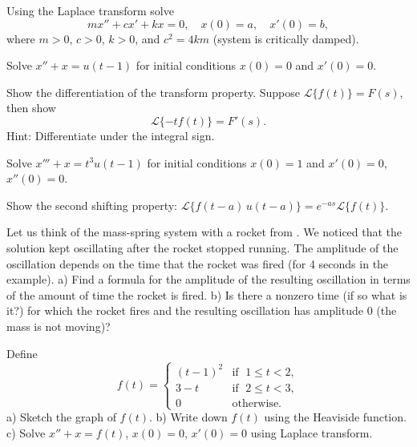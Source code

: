 \begin{exercise}
Using the Laplace transform solve
\begin{equation*}
m x'' + c x' + k x = 0 , \quad x(0) = a, \quad x'(0) = b ,
\end{equation*}
where $m > 0$, $c > 0$, $k > 0$, and
$c^2 = 4km$ (system is critically damped).
\end{exercise}

\begin{exercise}
Solve $x'' + x = u(t-1)$ for initial conditions $x(0) = 0$ and $x'(0) = 0$.
\end{exercise}

\begin{exercise}
Show the differentiation of the transform property.  Suppose
$\mathcal{L} \{ f(t) \} = F(s)$, then show
\begin{equation*}
\mathcal{L} \{ -t f(t) \} = F'(s) .
\end{equation*}
Hint: Differentiate under the integral sign.
\end{exercise}

\begin{exercise}
Solve $x''' + x = t^3 u(t-1)$ for initial conditions $x(0) = 1$ and $x'(0) =
0$, $x''(0) = 0$.
\end{exercise}

\begin{exercise}
Show the second shifting property: 
$\mathcal{L} \{ f(t-a) \, u(t-a) \} = e^{-as} \mathcal{L} \{ f(t) \}$.
\end{exercise}

\begin{exercise}
Let us think of the mass-spring system with a rocket from
.  We noticed that the solution kept oscillating
after the rocket stopped running.  The amplitude of the oscillation depends
on the time that the rocket was fired (for 4 seconds in the example).  a)
Find a formula for the amplitude of the resulting oscillation
in terms of the amount of time the rocket is fired.  b) Is there
a nonzero time (if so what is it?)
for which the rocket fires and the resulting oscillation
has amplitude 0 (the mass is not moving)?
\end{exercise}

\begin{exercise}
Define
\begin{equation*}
f(t) =
\begin{cases}
{(t-1)}^2 & \text{if } \; 1 \leq t < 2, \\
3-t & \text{if } \; 2 \leq t < 3, \\
0 & \text{otherwise} .
\end{cases}
\end{equation*}
a) Sketch the graph of $f(t)$.
b) Write down $f(t)$ using the Heaviside function.
c) Solve $x''+x=f(t)$, $x(0)=0$, $x'(0) = 0$ using Laplace transform.
\end{exercise}

